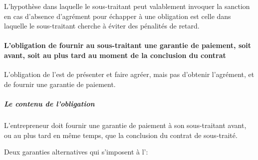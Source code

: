 					L'hypothèse dans laquelle le sous-traitant peut valablement invoquer la sanction en cas d'absence d'agrément pour échapper à une obligation est celle dans laquelle le sous-traitant cherche à éviter des pénalités de retard.

			\paragraph{L'obligation de fournir au sous-traitant une garantie de paiement, soit avant, soit au plus tard au moment de la conclusion du contrat}

				L’obligation de l’\ep est de présenter et faire agréer, mais pas d’obtenir l’agrément, et de fournir une garantie de paiement.

				\subparagraph{Le contenu de l'obligation}

					L’entrepreneur doit fournir une garantie de paiement à son sous-traitant avant, ou au plus tard en même temps, que la conclusion du contrat de sous-traité.

					\bigbreak Deux garanties alternatives qui s’imposent à l’\ep :

